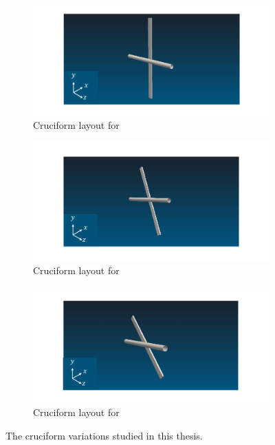 \documentclass[oneside]{utmthesis}
\begin{document}
\begin{figure}
  \centering
  \begin{subfigure}[h]{1\textwidth}
    \includegraphics[width=\textwidth]{figs/cruciform90}
    \caption{Cruciform layout for \angfi{}}
    \label{fig:cruciform90}
  \end{subfigure}

  \begin{subfigure}[h]{1\textwidth}
    \includegraphics[width=\textwidth]{figs/cruciform675}
    \caption{Cruciform layout for \angfo{}}
    \label{fig:cruciform675}
  \end{subfigure}

  \begin{subfigure}[h]{1\textwidth}
    \includegraphics[width=\textwidth]{figs/cruciform45}
    \caption{Cruciform layout for \angth{}}
    \label{fig:cruciform45}
  \end{subfigure}
  \caption{The cruciform variations studied in this thesis.}
\end{figure}
\end{document}
